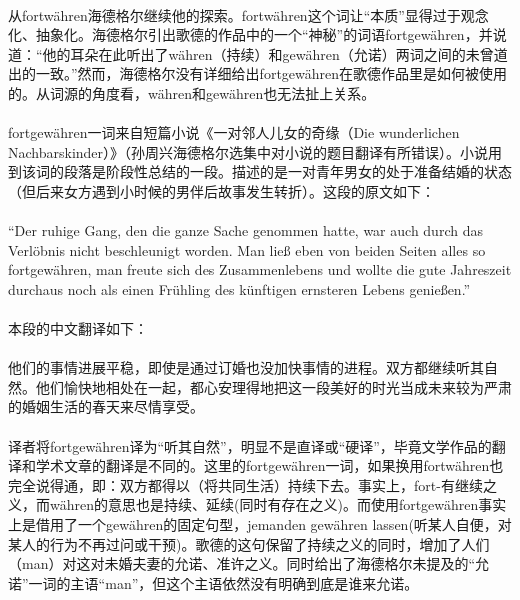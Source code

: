 \documentclass{article}
\begin{document}
		\paragraph{}
		从fortwähren海德格尔继续他的探索。fortwähren这个词让“本质”显得过于观念化、抽象化。海德格尔引出歌德的作品中的一个“神秘”的词语fortgewähren，并说道：“他的耳朵在此听出了währen（持续）和gewähren（允诺）两词之间的未曾道出的一致。”然而，海德格尔没有详细给出fortgewähren在歌德作品里是如何被使用的。从词源的角度看，währen和gewähren也无法扯上关系。
		\paragraph{}
		fortgewähren一词来自短篇小说《一对邻人儿女的奇缘（Die wunderlichen Nachbarskinder）》（孙周兴海德格尔选集中对小说的题目翻译有所错误）。小说用到该词的段落是阶段性总结的一段。描述的是一对青年男女的处于准备结婚的状态（但后来女方遇到小时候的男伴后故事发生转折）。这段的原文如下：
		\paragraph{}
		“Der ruhige Gang, den die ganze Sache genommen hatte, war auch durch das Verlöbnis nicht beschleunigt worden. Man ließ eben von beiden Seiten alles so fortgewähren, man freute sich des Zusammenlebens und wollte die gute Jahreszeit durchaus noch als einen Frühling des künftigen ernsteren Lebens genießen.”\cite{wNachbarK_Goet}
		\paragraph{}
		本段的中文翻译如下：\cite{wNachbarK_trans}
		\paragraph{}
		他们的事情进展平稳，即使是通过订婚也没加快事情的进程。双方都继续听其自然。他们愉快地相处在一起，都心安理得地把这一段美好的时光当成未来较为严肃的婚姻生活的春天来尽情享受。
		\paragraph{}
		译者将fortgewähren译为“听其自然”，明显不是直译或“硬译”，毕竟文学作品的翻译和学术文章的翻译是不同的。这里的fortgewähren一词，如果换用fortwähren也完全说得通，即：双方都得以（将共同生活）持续下去。事实上，fort-有继续之义，而währen的意思也是持续、延续(同时有存在之义)。而使用fortgewähren事实上是借用了一个gewähren的固定句型，jemanden gewähren lassen(听某人自便，对某人的行为不再过问或干预)。歌德的这句保留了持续之义的同时，增加了人们（man）对这对未婚夫妻的允诺、准许之义。同时给出了海德格尔未提及的“允诺”一词的主语“man”，但这个主语依然没有明确到底是谁来允诺。
\end{document}
